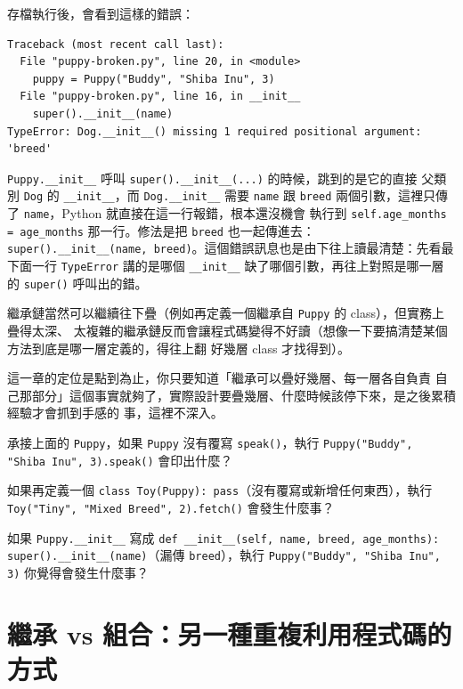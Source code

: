 存檔執行後，會看到這樣的錯誤：

\begin{verbatim}
Traceback (most recent call last):
  File "puppy-broken.py", line 20, in <module>
    puppy = Puppy("Buddy", "Shiba Inu", 3)
  File "puppy-broken.py", line 16, in __init__
    super().__init__(name)
TypeError: Dog.__init__() missing 1 required positional argument: 'breed'
\end{verbatim}

\texttt{Puppy.\_\_init\_\_} 呼叫 \texttt{super().\_\_init\_\_(...)} 的時候，跳到的是它的直接
父類別 \texttt{Dog} 的 \texttt{\_\_init\_\_}，而 \texttt{Dog.\_\_init\_\_} 需要 \texttt{name}
跟 \texttt{breed} 兩個引數，這裡只傳了 \texttt{name}，Python 就直接在這一行報錯，根本還沒機會
執行到 \texttt{self.age\_months = age\_months} 那一行。修法是把 \texttt{breed} 也一起傳進去：
\texttt{super().\_\_init\_\_(name, breed)}。這個錯誤訊息也是由下往上讀最清楚：先看最下面一行
\texttt{TypeError} 講的是哪個 \texttt{\_\_init\_\_} 缺了哪個引數，再往上對照是哪一層的
\texttt{super()} 呼叫出的錯。

繼承鏈當然可以繼續往下疊（例如再定義一個繼承自 \texttt{Puppy} 的 class），但實務上疊得太深、
太複雜的繼承鏈反而會讓程式碼變得不好讀（想像一下要搞清楚某個方法到底是哪一層定義的，得往上翻
好幾層 class 才找得到）。

這一章的定位是點到為止，你只要知道「繼承可以疊好幾層、每一層各自負責
自己那部分」這個事實就夠了，實際設計要疊幾層、什麼時候該停下來，是之後累積經驗才會抓到手感的
事，這裡不深入。

\begin{drills}[label=drills:multi-level-inheritance]
\item 承接上面的 \texttt{Puppy}，如果 \texttt{Puppy} 沒有覆寫 \texttt{speak()}，執行
\texttt{Puppy("Buddy", "Shiba Inu", 3).speak()} 會印出什麼？
\item 如果再定義一個 \texttt{class Toy(Puppy): pass}（沒有覆寫或新增任何東西），執行
\texttt{Toy("Tiny", "Mixed Breed", 2).fetch()} 會發生什麼事？
\item 如果 \texttt{Puppy.\_\_init\_\_} 寫成
\texttt{def \_\_init\_\_(self, name, breed, age\_months): super().\_\_init\_\_(name)}（漏傳
\texttt{breed}），執行 \texttt{Puppy("Buddy", "Shiba Inu", 3)} 你覺得會發生什麼事？
\end{drills}

\section{繼承 vs 組合：另一種重複利用程式碼的方式}
\label{sec:inheritance-vs-composition}

